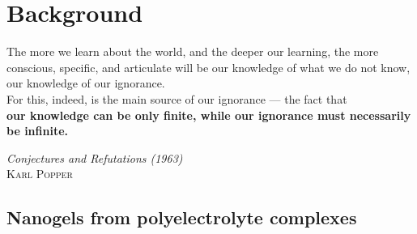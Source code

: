 \chapter{Background} \label{chap:background}
\vspace*{\fill}
\epigraph{The more we learn about the world, and the deeper our learning, the more conscious, specific, and articulate will be our knowledge of what we do not know, our knowledge of our ignorance.\\ For this, indeed, is the main source of our ignorance — the fact that\\ \textbf{our knowledge can be only finite, while our ignorance must necessarily be infinite.}}%
{\textit{Conjectures and Refutations (1963)}\\ \textsc{Karl Popper}}
\clearpage{\thispagestyle{empty}\cleardoublepage}
\section{Nanogels from polyelectrolyte complexes}


